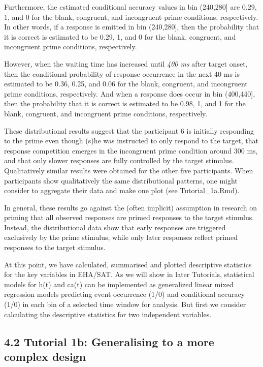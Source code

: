 \documentclass[
  man, donotrepeattitle,floatsintext]{apa6}
\begin{document}
Furthermore, the estimated conditional accuracy values in bin (240,280{]} are 0.29, 1, and 0 for the blank, congruent, and incongruent prime conditions, respectively. In other words, if a response is emitted in bin (240,280{]}, then the probability that it is correct is estimated to be 0.29, 1, and 0 for the blank, congruent, and incongruent prime conditions, respectively.

However, when the waiting time has increased until \emph{400 ms} after target onset, then the conditional probability of response occurrence in the next 40 ms is estimated to be 0.36, 0.25, and 0.06 for the blank, congruent, and incongruent prime conditions, respectively. And when a response does occur in bin (400,440{]}, then the probability that it is correct is estimated to be 0.98, 1, and 1 for the blank, congruent, and incongruent prime conditions, respectively.

These distributional results suggest that the participant 6 is initially responding to the prime even though (s)he was instructed to only respond to the target, that response competition emerges in the incongruent prime condition around 300 ms, and that only slower responses are fully controlled by the target stimulus. Qualitatively similar results were obtained for the other five participants. When participants show qualitatively the same distributional patterns, one might consider to aggregate their data and make one plot (see Tutorial\_1a.Rmd).

In general, these results go against the (often implicit) assumption in research on priming that all observed responses are primed responses to the target stimulus. Instead, the distributional data show that early responses are triggered exclusively by the prime stimulus, while only later responses reflect primed responses to the target stimulus.

At this point, we have calculated, summarised and plotted descriptive statistics for the key variables in EHA/SAT. As we will show in later Tutorials, statistical models for h(t) and ca(t) can be implemented as generalized linear mixed regression models predicting event occurrence (1/0) and conditional accuracy (1/0) in each bin of a selected time window for analysis. But first we consider calculating the descriptive statistics for two independent variables.

\subsection{4.2 Tutorial 1b: Generalising to a more complex design}\label{tutorial-1b-generalising-to-a-more-complex-design}
\end{document}
